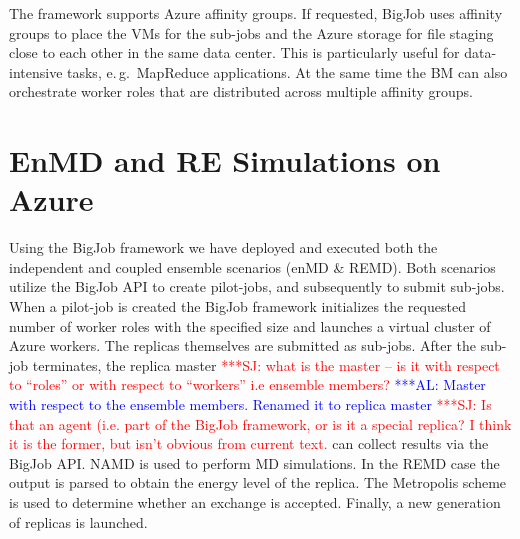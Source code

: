 \documentclass[conference,final]{IEEEtran}
\newcommand{\up}{\vspace*{-1em}}
\newcommand{\alnote}[1]{ {\textcolor{blue} { ***AL: #1 }}}
\newcommand{\jhanote}[1]{ {\textcolor{red} { ***SJ: #1 }}}
\newcommand{\alnote}[1]{}
\newcommand{\jhanote}[1]{}
\begin{document}
The framework supports Azure affinity groups.  %
If requested, BigJob uses affinity groups to place the VMs for the
sub-jobs and the Azure storage for file staging close to each other in
the same data center.  This is particularly useful for data-intensive
tasks, e.\,g.\ MapReduce applications. At the same time the BM can
also orchestrate worker roles that are distributed across multiple
affinity groups.




\up
\section{EnMD and RE Simulations on Azure}
\label{sec:enMD-REMD}
\up Using the BigJob framework we have deployed and executed both the
independent and coupled ensemble scenarios (enMD \& REMD).  Both
scenarios utilize the BigJob API to create pilot-jobs, and
subsequently to submit sub-jobs. When a pilot-job is created the
BigJob framework initializes the requested number of worker roles with
the specified size and launches a virtual cluster of Azure
workers. The replicas themselves are submitted as sub-jobs.  After the
sub-job terminates, the replica master \jhanote{what is the master --
  is it with respect to ``roles'' or with respect to ``workers'' i.e
  ensemble members?} \alnote{Master with respect to the ensemble
  members. Renamed it to replica master} \jhanote{Is that an agent
  (i.e. part of the BigJob framework, or is it a special replica? I
  think it is the former, but isn't obvious from current text.}  can
collect results via the BigJob API.  NAMD is used to perform MD
simulations.  In the REMD case the output is parsed to obtain the
energy level of the replica.  The Metropolis scheme is used to
determine whether an exchange is accepted. Finally, a new generation
of replicas is launched.

\end{document}
